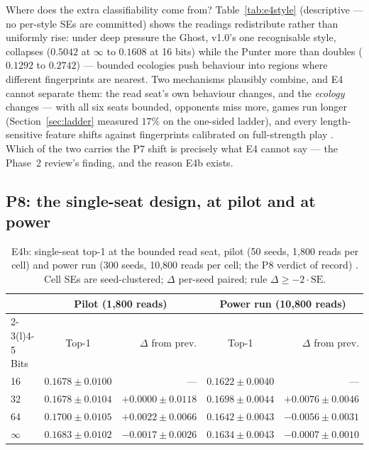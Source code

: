 \documentclass[11pt]{article}
\begin{document}
Where does the extra classifiability come from? Table~\ref{tab:e4style} (descriptive
--- no per-style SEs are committed) shows the readings redistribute rather than
uniformly rise: under deep pressure the Ghost, v1.0's one recognisable style, collapses
($0.5042$ at $\infty$ to $0.1608$ at 16 bits) while the Punter more than doubles
($0.1292$ to $0.2742$) --- bounded ecologies push behaviour into regions where
different fingerprints are nearest. Two mechanisms plausibly combine, and E4 cannot
separate them: the read seat's own behaviour changes, and the \emph{ecology} changes
--- with all six seats bounded, opponents miss more, games run longer
(Section~\ref{sec:ladder} measured $17\%$ on the one-sided ladder), and every
length-sensitive feature shifts against fingerprints calibrated on full-strength play
\cite{fingerprints,obspaper}. Which of the two carries the P7 shift is precisely what
E4 cannot say --- the Phase~2 review's finding, and the reason E4b exists.

\subsection{P8: the single-seat design, at pilot and at power}
\label{sec:p8}

\begin{table}[t]
\centering
\caption{E4b: single-seat top-1 at the bounded read seat, pilot (50 seeds, 1{,}800
reads per cell) and power run (300 seeds, 10{,}800 reads per cell; the P8 verdict of
record) \cite{artifact}. Cell SEs are seed-clustered; $\Delta$ per-seed paired; rule
$\Delta \ge -2 \cdot \text{SE}$.}
\label{tab:e4b}
\footnotesize
\begin{tabular}{@{}lcr@{\qquad}cr@{}}
\toprule
 & \multicolumn{2}{c}{Pilot (1{,}800 reads)} & \multicolumn{2}{c}{Power run (10{,}800 reads)} \\
\cmidrule(r){2-3}\cmidrule(l){4-5}
Bits & Top-1 & $\Delta$ from prev. & Top-1 & $\Delta$ from prev. \\
\midrule
16       & $0.1678 \pm 0.0100$ & --- & $0.1622 \pm 0.0040$ & --- \\
32       & $0.1678 \pm 0.0104$ & $+0.0000 \pm 0.0118$ & $0.1698 \pm 0.0044$ & $+0.0076 \pm 0.0046$ \\
64       & $0.1700 \pm 0.0105$ & $+0.0022 \pm 0.0066$ & $0.1642 \pm 0.0043$ & $-0.0056 \pm 0.0031$ \\
$\infty$ & $0.1683 \pm 0.0102$ & $-0.0017 \pm 0.0026$ & $0.1634 \pm 0.0043$ & $-0.0007 \pm 0.0010$ \\
\bottomrule
\end{tabular}
\end{table}
\end{document}
